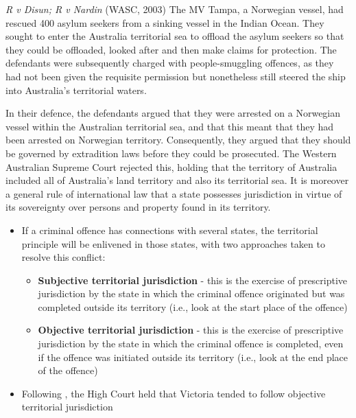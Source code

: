 \begin{casedetails}{\textit{R v Disun; R v Nardin} (WASC, 2003)}
    \flushleft
    The MV Tampa, a Norwegian vessel, had rescued 400 asylum seekers from a sinking vessel in the Indian Ocean. They sought to enter the Australia territorial sea to offload the asylum seekers so that they could be offloaded, looked after and then make claims for protection. The defendants were subsequently charged with people-smuggling offences, as they had not been given the requisite permission but nonetheless still steered the ship into Australia's territorial waters.

    \vspace{\baselineskip}

    In their defence, the defendants argued that they were arrested on a Norwegian vessel within the Australian territorial sea, and that this meant that they had been arrested on Norwegian territory. Consequently, they argued that they should be governed by extradition laws before they could be prosecuted. The Western Australian Supreme Court rejected this, holding that the territory of Australia included all of Australia's land territory and also its territorial sea. It is moreover a general rule of international law that a state possesses jurisdiction in virtue of its sovereignty over persons and property found in its territory.
\end{casedetails}

\begin{itemize}
    \item If a criminal offence has connections with several states, the territorial principle will be enlivened in those states, with two approaches taken to resolve this conflict:
    \begin{itemize}
        \item \textbf{Subjective territorial jurisdiction} - this is the exercise of prescriptive jurisdiction by the state in which the criminal offence originated but was completed outside its territory (i.e., look at the start place of the offence)
        \item \textbf{Objective territorial jurisdiction} - this is the exercise of prescriptive jurisdiction by the state in which the criminal offence is completed, even if the offence was initiated outside its territory (i.e., look at the end place of the offence)
    \end{itemize}
    \item Following , the High Court held that Victoria tended to follow objective territorial jurisdiction
\end{itemize}

